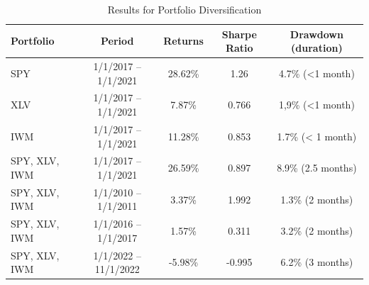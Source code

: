 \documentclass[10pt]{article}
\theoremstyle{definition}
\begin{document}
\begin{table}[h]
\begin{center}
\begin{tabular}{@{}lcccc @{}}
\toprule
\textbf{Portfolio} & \textbf{Period}      & \textbf{Returns} & \textbf{Sharpe Ratio} & \textbf{Drawdown (duration)} \\ \midrule
SPY & 1/1/2017 – 1/1/2021  & 28.62\%  & 1.26 & 4.7\% (<1 month)\\
XLV & 1/1/2017 – 1/1/2021 &  7.87\% & 0.766 & 1,9\% (<1 month) \\
IWM & 1/1/2017 – 1/1/2021  & 11.28\%   & 0.853 &  1.7\% (< 1 month)\\
SPY, XLV, IWM &  1/1/2017 – 1/1/2021  &  26.59\% & 0.897 & 8.9\% (2.5 months) \\
SPY, XLV, IWM &  1/1/2010 – 1/1/2011  &  3.37\% & 1.992 & 1.3\% (2 months)\\
SPY, XLV, IWM &  1/1/2016 – 1/1/2017 &  1.57\% & 0.311 & 3.2\% (2 months)\\
SPY, XLV, IWM &  1/1/2022 – 11/1/2022  & -5.98\% & -0.995 & 6.2\% (3 months)
\\\midrule
\end{tabular}
\caption{Results for Portfolio Diversification}
\label{ResultsDiversification}
\end{center}
\end{table}
\end{document}
